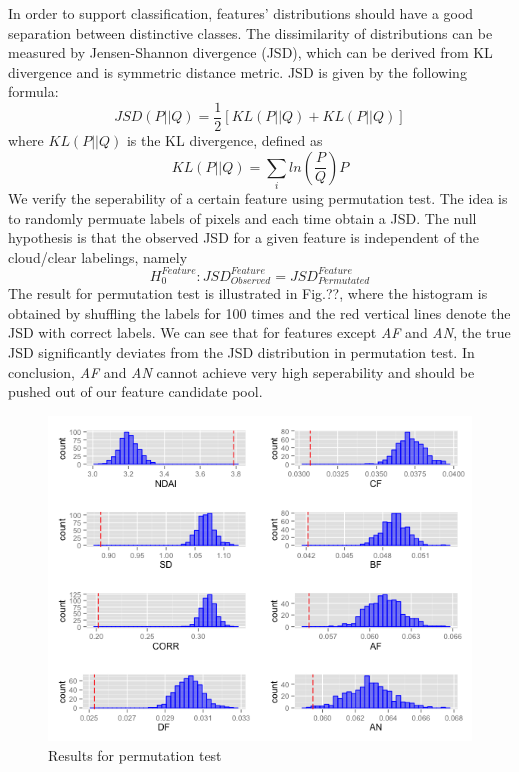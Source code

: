 \documentclass[english]{article}\usepackage{graphicx, color}
\numberwithin{equation}{section}
\numberwithin{figure}{section}
\begin{document}
In order to support classification, features' distributions should have a good separation between distinctive classes. The dissimilarity of distributions can be measured by Jensen-Shannon divergence (JSD), which can be derived from KL divergence and is symmetric distance metric. JSD is given by the following formula:
\begin{equation}
JSD(P||Q) = \frac{1}{2} [KL(P||Q) + KL(P||Q)]
\end{equation}
where $KL(P||Q)$ is the KL divergence, defined as 
\begin{equation}
KL(P||Q) = \sum_i{ln(\frac{P}{Q})P}
\end{equation}
We verify the seperability of a certain feature using permutation test. The idea is to randomly permuate labels of pixels and each time obtain a JSD. The null hypothesis is that the observed JSD for a given feature is independent of the cloud/clear labelings, namely
\begin{equation}
H_0^{Feature}:JSD_{Observed}^{Feature}=JSD_{Permutated}^{Feature}
\end{equation}
The result for permutation test is illustrated in Fig.??, where the histogram is obtained by shuffling the labels for 100 times and the red vertical lines denote the JSD with correct labels. We can see that for features except \textit{AF} and \textit{AN}, the true JSD significantly deviates from the JSD distribution in permutation test. In conclusion, \textit{AF} and \textit{AN} cannot achieve very high seperability and should be pushed out of our feature candidate pool.

\begin{figure}[!h]
  \begin{center}
    \includegraphics[width=\columnwidth]{figures/PermutationTest.png}
  \end{center}
  \caption{Results for permutation test}
  \label{fig:PT}
\end{figure}
\end{document}
